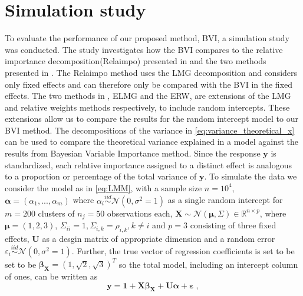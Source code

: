 


\section{Simulation study}
\label{sec:simulations}
To evaluate the performance of our proposed method, BVI, a simulation study was conducted. The study investigates how the BVI compares to the relative importance decomposition(Relaimpo) presented in \citet{gromping_relaimpo} and the two methods presented in \citet{matre}.
The Relaimpo method uses the LMG decomposition and considers only fixed effects and can therefore only be compared with the BVI in the fixed effects. The two methods in \citet{matre}, ELMG and the ERW, are extensions of the LMG and relative weights methods respectively, to include random intercepts.
These extensions allow us to compare the results for the random intercept model to our BVI method. The decompositions of the variance in \eqref{eq:variance_theoretical_x} can be used to compare the theoretical variance explained in a model against the results from Bayesian Variable Importance method.
Since the response $\mathbf{y}$ is standardized, each relative importance assigned to a distinct effect is analogous to a proportion or percentage of the total variance of $\mathbf{y}$.
\newline
\newline
To simulate the data we consider the model as in \eqref{eq:LMM}, with a sample size $n=10^4$, $\boldsymbol{\alpha}=(\alpha_1, ..., \alpha_m)$ where $\alpha_i \stackrel{iid}{\sim} \mathcal{N}(0, \sigma^2=1)$ as a single random intercept for $m=200$ clusters of $n_j=50$ observations each, $\mathbf{X} \sim \mathcal{N}(\boldsymbol{\mu},\Sigma) \in \mathbb{R}^{n \times p}$, where $\boldsymbol{\mu}=(1, 2, 3)$, $\Sigma_{ii} = 1, \Sigma_{i, k}=\rho_{i, k}, k\neq i$ and $p=3$ consisting of three fixed effects, $\mathbf{U}$ as a desgin matrix of appropriate dimension and a random error $\varepsilon_i \stackrel{iid}{\sim} \mathcal{N}(0, \sigma^2=1)$. 
Further, the true vector of regression coefficients is set to be set to be $\boldsymbol{\beta}_{\mathbf{X}}=(1, \sqrt{2}, \sqrt{3})^T$ so the total model, including an intercept column of ones, can be written as
\begin{equation}
    \label{eq:simulation_model}
    \mathbf{y} = \mathbf{1} + \mathbf{X}\boldsymbol{\beta}_{\mathbf{X}} + \mathbf{U}\boldsymbol{\alpha} + \boldsymbol{\varepsilon} \ ,
\end{equation}

